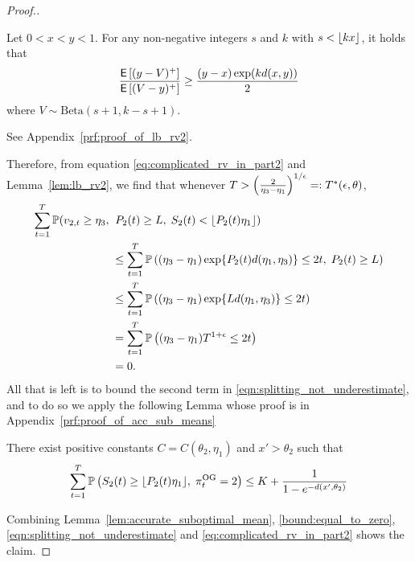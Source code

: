 \begin{proof}[Proof.]
	\begin{lemma} \label{lem:lb_rv2}
		Let $0 < x < y < 1$. For any non-negative integers $s$ and $k$ with $s < \lfloor kx\rfloor$, it holds that
		\begin{equation*}
		\frac{\mathsf{E} \left[ (y-V)^+  \right]}{  \mathsf{E} \left[ (V - y)^+  \right] } \ge \frac{(y-x) \exp(k d(x,y))}{2}
		\end{equation*}
		where $V \sim \text{Beta}(s+1,k-s+1)$.
	\end{lemma}
	\begin{myproof}[Proof.]
		See Appendix~\ref{prf:proof_of_lb_rv2}.
	\end{myproof}
	Therefore, from equation \eqref{eq:complicated_rv_in_part2} and Lemma~\ref{lem:lb_rv2}, we find that whenever $T > \left(\frac{2}{\eta_3-\eta_1}\right)^{1/\epsilon} =: T^*(\epsilon, \theta)$,
	\begin{align}
	\sum_{t=1}^T \mathbb{P}(v_{2,t} \ge \eta_3 ,\; & \; P_{2}(t) \ge L,\; S_2(t) < \lfloor P_{2}(t) \eta_1\rfloor) \nonumber \\
	& \le  \sum_{t=1}^T\mathbb{P} \left(   (\eta_3-\eta_1) \exp\{P_{2}(t) d(\eta_1,\eta_3) \} \le 2t,\; P_{2}(t) \ge L \right) \nonumber \\
	& \le  \sum_{t=1}^T\mathbb{P} \left(   (\eta_3-\eta_1) \exp\{L d(\eta_1,\eta_3) \} \le 2t \right) \nonumber \\
	& =   \sum_{t=1}^T\mathbb{P} \left(   (\eta_3-\eta_1) T^{1+\epsilon} \le 2t \right) \nonumber \\
	& = 0. \label{bound:equal_to_zero}
	\end{align}
	All that is left is to bound the second term in \eqref{eqn:splitting_not_underestimate}, and to do so we apply the following Lemma whose proof is in Appendix~\ref{prf:proof_of_acc_sub_means}
	\begin{lemma} \label{lem:accurate_suboptimal_mean}
		There exist positive constants $C = C(\theta_2,\eta_1)$ and $x' > \theta_2$ such that
		\begin{equation*}
		\sum_{t=1}^T \mathbb{P} \left( S_2(t) \ge \lfloor P_{2}(t) \eta_1\rfloor, \; \pi^{\rm OG}_t = 2 \right) \le  K + \frac{1}{1 - e^{-d(x',\theta_2)}} 
		\end{equation*}
	\end{lemma}
	Combining Lemma~\ref{lem:accurate_suboptimal_mean}, \eqref{bound:equal_to_zero}, \eqref{eqn:splitting_not_underestimate} and \eqref{eq:complicated_rv_in_part2} shows the claim.
\end{proof}

